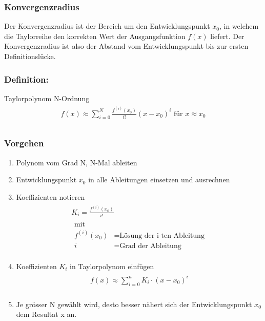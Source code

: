 \subsubsection{Konvergenzradius}
Der Konvergenzradius ist der Bereich um den Entwicklungspunkt $x_0$, in welchem die Taylorreihe den korrekten Wert der Ausgangsfunktion $f(x)$ liefert. Der Konvergenzradius ist also der Abstand vom Entwicklungspunkt bis zur ersten Definitionslücke.

\subsubsection{Definition:}
Taylorpolynom N-Ordnung 
\begin{align}
\begin{split}
f(x) \approx \sum_{i=0}^{N}\frac{f^{(i)}(x_0)}{i!}(x-x_0)^i \text{ für } x \approx x_0 \\
\end{split}
\end{align}	

\subsubsection{Vorgehen}
\begin{enumerate}
	\item Polynom vom Grad N, N-Mal ableiten
	\item Entwicklungspunkt $x_0$ in alle Ableitungen einsetzen und ausrechnen
	\item Koeffizienten notieren 
	\begin{align*}
	\begin{split}
		K_i = \frac{f^{(i)}(x_0)}{i!} \\
		\begin{aligned}
		\text{mit } \\
		f^{(i)}(x_0) &= \text{Lösung der i-ten Ableitung} \\
		i &= \text{Grad der Ableitung}
		\end{aligned}
	\end{split}
	\end{align*}	
	\item Koeffizienten $K_i$ in Taylorpolynom einfügen
	\begin{align}
	\begin{split}
	f(x) \approx \sum_{i=0}^{n}K_i \cdot (x-x_0)^i \\
	\end{split}
	\end{align}	
	\item Je grösser N gewählt wird, desto besser nähert sich der Entwicklungspunkt $x_0$ dem Resultat x an.
\end{enumerate}

